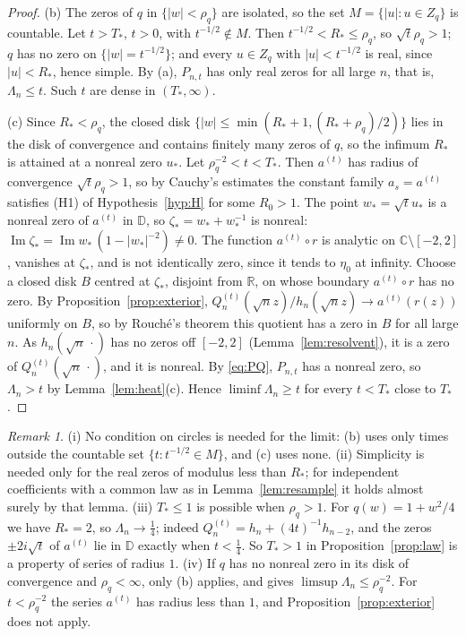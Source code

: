 \documentclass[11pt]{amsart}
\theoremstyle{definition}
\theoremstyle{remark}
\newtheorem{remark}[theorem]{Remark}
\numberwithin{equation}{section}
\newcommand{\C}{\mathbb{C}}
\newcommand{\R}{\mathbb{R}}
\newcommand{\D}{\mathbb{D}}
\DeclareMathOperator{\im}{Im}
\begin{document}
\begin{proof}
(b) The zeros of $q$ in $\{|w|<\rho_q\}$ are isolated, so the set $M=\{|u|:u\in Z_q\}$ is countable. Let $t>T_*$, $t>0$, with $t^{-1/2}\notin M$. Then $t^{-1/2}<R_*\le\rho_q$, so $\sqrt t\rho_q>1$; $q$ has no zero on $\{|w|=t^{-1/2}\}$; and every $u\in Z_q$ with $|u|<t^{-1/2}$ is real, since $|u|<R_*$, hence simple. By (a), $P_{n,t}$ has only real zeros for all large $n$, that is, $\Lambda_n\le t$. Such $t$ are dense in $(T_*,\infty)$.

(c) Since $R_*<\rho_q$, the closed disk $\{|w|\le\min(R_*+1,(R_*+\rho_q)/2)\}$ lies in the disk of convergence and contains finitely many zeros of $q$, so the infimum $R_*$ is attained at a nonreal zero $u_*$. Let $\rho_q^{-2}<t<T_*$. Then $a^{(t)}$ has radius of convergence $\sqrt t\rho_q>1$, so by Cauchy's estimates the constant family $a_s=a^{(t)}$ satisfies (H1) of Hypothesis~\ref{hyp:H} for some $R_0>1$. The point $w_*=\sqrt tu_*$ is a nonreal zero of $a^{(t)}$ in $\D$, so $\zeta_*=w_*+w_*^{-1}$ is nonreal: $\im\zeta_*=\im w_*\,(1-|w_*|^{-2})\ne0$. The function $a^{(t)}\circ r$ is analytic on $\C\setminus[-2,2]$, vanishes at $\zeta_*$, and is not identically zero, since it tends to $\eta_0$ at infinity. Choose a closed disk $B$ centred at $\zeta_*$, disjoint from $\R$, on whose boundary $a^{(t)}\circ r$ has no zero. By Proposition~\ref{prop:exterior}, $Q_n^{(t)}(\sqrt nz)/h_n(\sqrt nz)\to a^{(t)}(r(z))$ uniformly on $B$, so by Rouch\'e's theorem this quotient has a zero in $B$ for all large $n$. As $h_n(\sqrt n\,\cdot)$ has no zeros off $[-2,2]$ (Lemma~\ref{lem:resolvent}), it is a zero of $Q^{(t)}_n(\sqrt n\,\cdot)$, and it is nonreal. By \eqref{eq:PQ}, $P_{n,t}$ has a nonreal zero, so $\Lambda_n>t$ by Lemma~\ref{lem:heat}(c). Hence $\liminf\Lambda_n\ge t$ for every $t<T_*$ close to $T_*$.
\end{proof}

\begin{remark}\label{rem:fixedq}
(i) No condition on circles is needed for the limit: (b) uses only times outside the countable set $\{t:t^{-1/2}\in M\}$, and (c) uses none. (ii) Simplicity is needed only for the real zeros of modulus less than $R_*$; for independent coefficients with a common law as in Lemma~\ref{lem:resample} it holds almost surely by that lemma. (iii) $T_*\le1$ is possible when $\rho_q>1$. For $q(w)=1+w^2/4$ we have $R_*=2$, so $\Lambda_n\to\frac14$; indeed $Q^{(t)}_n=h_n+(4t)^{-1}h_{n-2}$, and the zeros $\pm2i\sqrt t$ of $a^{(t)}$ lie in $\D$ exactly when $t<\frac14$. So $T_*>1$ in Proposition~\ref{prop:law} is a property of series of radius $1$. (iv) If $q$ has no nonreal zero in its disk of convergence and $\rho_q<\infty$, only (b) applies, and gives $\limsup\Lambda_n\le\rho_q^{-2}$. For $t<\rho_q^{-2}$ the series $a^{(t)}$ has radius less than $1$, and Proposition~\ref{prop:exterior} does not apply.
\end{remark}
\end{document}
